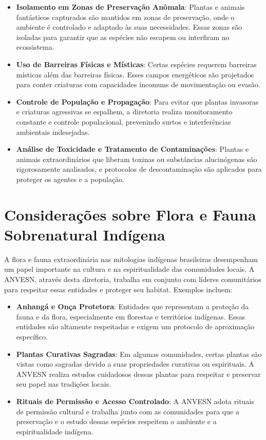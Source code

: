 \begin{itemize}
    \item \textbf{Isolamento em Zonas de Preservação Anômala}: Plantas e animais fantásticos capturados são mantidos em zonas de preservação, onde o ambiente é controlado e adaptado às suas necessidades. Essas zonas são isoladas para garantir que as espécies não escapem ou interfiram no ecossistema.
    \item \textbf{Uso de Barreiras Físicas e Místicas}: Certas espécies requerem barreiras místicas além das barreiras físicas. Esses campos energéticos são projetados para conter criaturas com capacidades incomuns de movimentação ou evasão.
    \item \textbf{Controle de População e Propagação}: Para evitar que plantas invasoras e criaturas agressivas se espalhem, a diretoria realiza monitoramento constante e controle populacional, prevenindo surtos e interferências ambientais indesejadas.
    \item \textbf{Análise de Toxicidade e Tratamento de Contaminações}: Plantas e animais extraordinários que liberam toxinas ou substâncias alucinógenas são rigorosamente analisados, e protocolos de descontaminação são aplicados para proteger os agentes e a população.
\end{itemize}

\section{Considerações sobre Flora e Fauna Sobrenatural Indígena}
A flora e fauna extraordinária nas mitologias indígenas brasileiras desempenham um papel importante na cultura e na espiritualidade das comunidades locais. A ANVESN, através desta diretoria, trabalha em conjunto com líderes comunitários para respeitar essas entidades e proteger seu habitat. Exemplos incluem:

\begin{itemize}
    \item \textbf{Anhangá e Onça Protetora}: Entidades que representam a proteção da fauna e da flora, especialmente em florestas e territórios indígenas. Essas entidades são altamente respeitadas e exigem um protocolo de aproximação específico.
    \item \textbf{Plantas Curativas Sagradas}: Em algumas comunidades, certas plantas são vistas como sagradas devido a suas propriedades curativas ou espirituais. A ANVESN realiza estudos cuidadosos dessas plantas para respeitar e preservar seu papel nas tradições locais.
    \item \textbf{Rituais de Permissão e Acesso Controlado}: A ANVESN adota rituais de permissão cultural e trabalha junto com as comunidades para que a preservação e o estudo dessas espécies respeitem o ambiente e a espiritualidade indígena.
\end{itemize}



